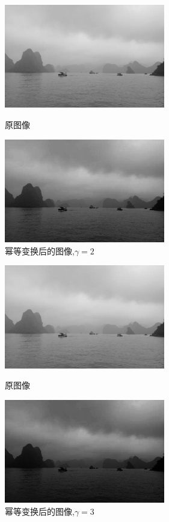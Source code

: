 \documentclass[11pt, a4paper, UTF8]{ctexart}
\begin{document}
\begin{figure}[H]
  \centering
  \begin{minipage}[t]{0.48\textwidth}
  \centering
  \includegraphics[width=7cm]{gray.jpg}
  \caption{原图像}
  \end{minipage}
  \begin{minipage}[t]{0.48\textwidth}
  \centering
  \includegraphics[width=7cm]{gray_power_2_converted.jpg}
  \caption{幂等变换后的图像,$\gamma=2$}
  \end{minipage}
\end{figure}


\begin{figure}[H]
  \centering
  \begin{minipage}[t]{0.48\textwidth}
  \centering
  \includegraphics[width=7cm]{gray.jpg}
  \caption{原图像}
  \end{minipage}
  \begin{minipage}[t]{0.48\textwidth}
  \centering
  \includegraphics[width=7cm]{gray_power_3_converted.jpg}
  \caption{幂等变换后的图像,$\gamma=3$}
  \end{minipage}
\end{figure}
\end{document}

